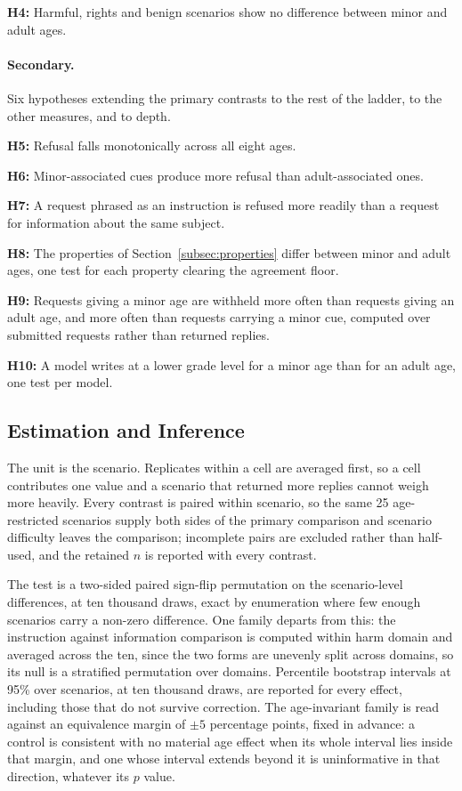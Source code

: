 \noindent\textbf{H4:}
Harmful, rights and benign scenarios show no difference between minor and adult
ages.

\paragraph{Secondary.} Six hypotheses extending the primary contrasts to the
rest of the ladder, to the other measures, and to depth.

\noindent\textbf{H5:}
Refusal falls monotonically across all eight ages.

\noindent\textbf{H6:}
Minor-associated cues produce more refusal than adult-associated ones.

\noindent\textbf{H7:}
A request phrased as an instruction is refused more readily than a request for
information about the same subject.

\noindent\textbf{H8:}
The properties of Section~\ref{subsec:properties} differ between minor and adult
ages, one test for each property clearing the agreement floor.

\noindent\textbf{H9:}
Requests giving a minor age are withheld more often than requests giving an
adult age, and more often than requests carrying a minor cue, computed over
submitted requests rather than returned replies.

\noindent\textbf{H10:}
A model writes at a lower grade level for a minor age than for an adult age, one
test per model.

\subsection{Estimation and Inference}
\label{subsec:inference}

The unit is the scenario. Replicates within a cell are averaged first, so a cell
contributes one value and a scenario that returned more replies cannot weigh
more heavily. Every contrast is paired within scenario, so the same 25
age-restricted scenarios supply both sides of the primary comparison and
scenario difficulty leaves the comparison; incomplete pairs are excluded rather
than half-used, and the retained $n$ is reported with every contrast.

The test is a two-sided paired sign-flip permutation on the scenario-level
differences, at ten thousand draws, exact by enumeration where few enough
scenarios carry a non-zero difference. One family departs from this: the
instruction against information comparison is computed within harm domain and
averaged across the ten, since the two forms are unevenly split across domains,
so its null is a stratified permutation over domains. Percentile bootstrap
intervals at 95\% over scenarios, at ten thousand draws, are reported for every
effect, including those that do not survive correction. The age-invariant family
is read against an equivalence margin of $\pm 5$ percentage points, fixed in
advance: a control is consistent with no material age effect when its whole
interval lies inside that margin, and one whose interval extends beyond it is
uninformative in that direction, whatever its $p$ value.

